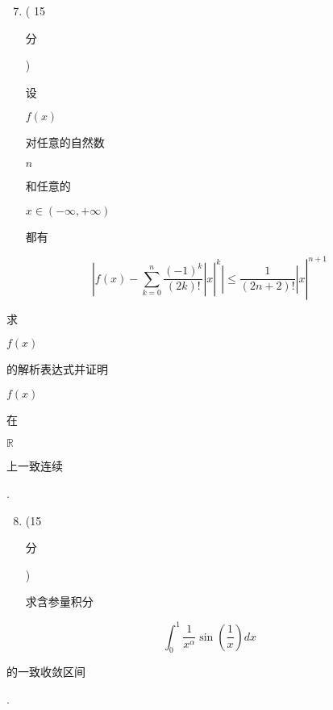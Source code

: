 \documentclass[10pt]{article}
\begin{document}
\begin{enumerate}
  \setcounter{enumi}{6}
  \item ( 15 \begin{CJK}{UTF8}{mj}分\end{CJK}) \begin{CJK}{UTF8}{mj}设\end{CJK} $f(x)$ \begin{CJK}{UTF8}{mj}对任意的自然数\end{CJK} $n$ \begin{CJK}{UTF8}{mj}和任意的\end{CJK} $x \in(-\infty,+\infty)$ \begin{CJK}{UTF8}{mj}都有\end{CJK}
\end{enumerate}
$$
\left.\left.\left|f(x)-\sum_{k=0}^{n} \frac{(-1)^{k}}{(2 k) !}\right| x\right|^{k}\left|\leqslant \frac{1}{(2 n+2) !}\right| x\right|^{n+1}
$$
\begin{CJK}{UTF8}{mj}求\end{CJK} $f(x)$ \begin{CJK}{UTF8}{mj}的解析表达式并证明\end{CJK} $f(x)$ \begin{CJK}{UTF8}{mj}在\end{CJK} $\mathbb{R}$ \begin{CJK}{UTF8}{mj}上一致连续\end{CJK}.

\begin{enumerate}
  \setcounter{enumi}{7}
  \item (15 \begin{CJK}{UTF8}{mj}分\end{CJK}) \begin{CJK}{UTF8}{mj}求含参量积分\end{CJK}
\end{enumerate}
$$
\int_{0}^{1} \frac{1}{x^{\alpha}} \sin \left(\frac{1}{x}\right) d x
$$
\begin{CJK}{UTF8}{mj}的一致收敛区间\end{CJK}.
\end{document}
